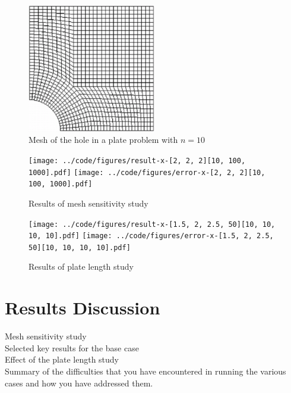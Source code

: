 \documentclass[twocolumn,10pt]{asme2ej}
\begin{document}
\begin{figure}[tb]
\begin{center}
\includegraphics[width=0.5\textwidth]{figure/user152x.png}
\caption{Mesh of the hole in a plate problem with $n = 10$}
\label{mesh}
\end{center}
\end{figure}

\begin{figure}[tb]
\begin{center}
\texttt{[image: ../code/figures/result-x-[2, 2, 2][10, 100, 1000].pdf]}
\texttt{[image: ../code/figures/error-x-[2, 2, 2][10, 100, 1000].pdf]}
\caption{Results of mesh sensitivity study}
\label{sensitivity_study}
\texttt{[image: ../code/figures/result-x-[1.5, 2, 2.5, 50][10, 10, 10, 10].pdf]}
\texttt{[image: ../code/figures/error-x-[1.5, 2, 2.5, 50][10, 10, 10, 10].pdf]}
\caption{Results of plate length study}
\label{length_study}
\end{center}
\end{figure}


\section{Results Discussion}
\noindent Mesh sensitivity study\\
Selected key results for the base case\\
Effect of the plate length study\\
Summary of the difficulties that you have encountered in running the various cases and how you have addressed them.\\
\end{document}
